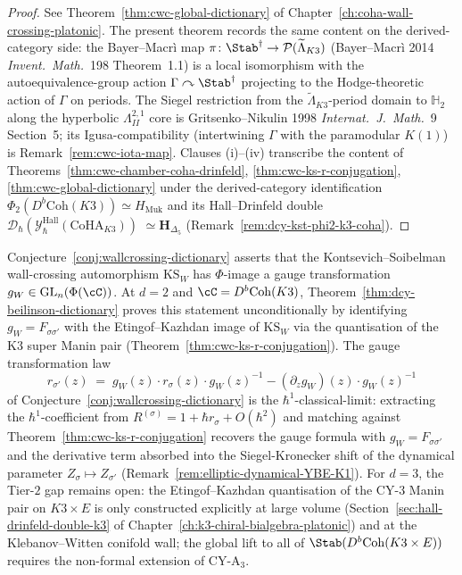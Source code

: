 \begin{proof}
See Theorem~\ref{thm:cwc-global-dictionary} of
Chapter~\ref{ch:coha-wall-crossing-platonic}. The present theorem records
the same content on the derived-category side: the Bayer--Macr\`i map
$\pi\colon\Stab^\dagger\to\mathcal{P}(\widetilde{\Lambda}_{K3})$
(Bayer--Macr\`i 2014 \emph{Invent.\ Math.}~198 Theorem~1.1) is a local
isomorphism with the autoequivalence-group action
$\Gamma\curvearrowright\Stab^\dagger$ projecting to the Hodge-theoretic
action of $\Gamma$ on periods. The Siegel restriction from the
$\widetilde{\Lambda}_{K3}$-period domain to $\mathbb{H}_2$ along the
hyperbolic $\Lambda^{2,1}_{II}$ core is Gritsenko--Nikulin 1998
\emph{Internat.\ J.\ Math.}~9 Section~5; its Igusa-compatibility
(intertwining $\Gamma$ with the paramodular $K(1)$) is
Remark~\ref{rem:cwc-iota-map}. Clauses (i)--(iv) transcribe the
content of
Theorems~\ref{thm:cwc-chamber-coha-drinfeld},
\ref{thm:cwc-ks-r-conjugation},
\ref{thm:cwc-global-dictionary} under the derived-category
identification $\Phi_2(D^b\mathrm{Coh}(K3))\simeq H_{\mathrm{Muk}}$ and
its Hall--Drinfeld double
$\mathcal{D}_\hbar(\mathcal{Y}^{\mathrm{Hall}}_\hbar(\mathrm{CoHA}_{K3}))$
$\simeq \mathbf{H}_{\Delta_5}$
(Remark~\ref{rem:dcy-kst-phi2-k3-coha}).
\end{proof}

\begin{remark}
\label{rem:dcy-closing-wallcrossing-dict}
Conjecture~\ref{conj:wallcrossing-dictionary} asserts that the
Kontsevich--Soibelman wall-crossing automorphism
$\mathrm{KS}_W$ has $\Phi$-image a gauge transformation
$g_W\in\mathrm{GL}_n(\Phi(\cC))$. At $d=2$ and
$\cC=D^b\mathrm{Coh}(K3)$,
Theorem~\ref{thm:dcy-beilinson-dictionary} proves this
statement unconditionally by identifying
$g_W=F_{\sigma\sigma'}$ with the Etingof--Kazhdan image of
$\mathrm{KS}_W$ via the quantisation of the K3 super Manin pair
(Theorem~\ref{thm:cwc-ks-r-conjugation}). The gauge
transformation law
\[
 r_{\sigma'}(z)
 \;=\;g_W(z)\cdot r_\sigma(z)\cdot g_W(z)^{-1}
 -(\partial_z g_W)(z)\cdot g_W(z)^{-1}
\]
of Conjecture~\ref{conj:wallcrossing-dictionary} is the
$\hbar^1$-classical-limit: extracting the
$\hbar^1$-coefficient from
$R^{(\sigma)}=1+\hbar r_\sigma+O(\hbar^2)$ and matching against
Theorem~\ref{thm:cwc-ks-r-conjugation} recovers the gauge
formula with $g_W=F_{\sigma\sigma'}$ and the derivative term absorbed
into the Siegel-Kronecker shift of the dynamical parameter
$Z_\sigma\mapsto Z_{\sigma'}$
(Remark~\ref{rem:elliptic-dynamical-YBE-K1}). For $d=3$, the Tier-$2$
gap remains open: the Etingof--Kazhdan quantisation of the CY-$3$
Manin pair on $K3\times E$ is only constructed explicitly at large
volume (Section~\ref{sec:hall-drinfeld-double-k3} of
Chapter~\ref{ch:k3-chiral-bialgebra-platonic}) and at the Klebanov--Witten
conifold wall; the global lift to all of $\Stab(D^b\mathrm{Coh}(K3\times E))$
requires the non-formal extension of CY-A$_3$.
\end{remark}

